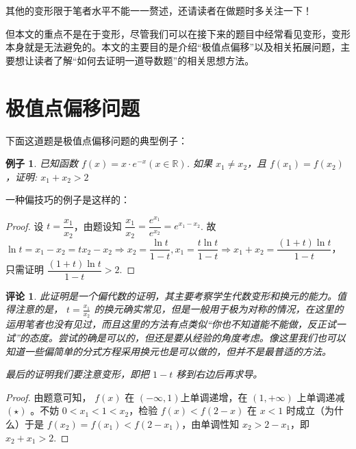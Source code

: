 \documentclass[a4paper,10pt]{article}
\newtheorem{example}{例子}
\newtheorem{remark}{评论}
\begin{document}
其他的变形限于笔者水平不能一一赘述，还请读者在做题时多关注一下！

但本文的重点不是在于变形，尽管我们可以在接下来的题目中经常看见变形，变形本身就是无法避免的。本文的主要目的是介绍“极值点偏移”以及相关拓展问题，主要想让读者了解“如何去证明一道导数题”的相关思想方法。
\section{极值点偏移问题}
下面这道题是极值点偏移问题的典型例子：

\begin{example}
    已知函数 $ f(x)=x\cdot e^{-x}(x\in\mathbb{R }) $. 如果 $ x_1\not=x_2  $，且 $ f(x_1)=f(x_2) $，证明: $ x_1+x_2>2 $   
\end{example}

一种偏技巧的例子是这样的：

\begin{proof}
    设 $ t=\dfrac{x_1 }{x_2 } $，由题设知 $ \dfrac{x_1 }{x_2 }=\dfrac{e^{x_1}}{e^{x_2}}=e^{x_1-x_2} $. 故 $ \ln t=x_1-x_2=tx_2-x_2\Rightarrow x_2=\dfrac{\ln t}{1-t},x_1=\dfrac{t\ln t }{1-t}\Rightarrow x_1+x_2=\dfrac{(1+t)\ln t  }{1-t} $，只需证明 $ \dfrac{(1+t)\ln t  }{1-t}>2 $.  
\end{proof}

\begin{remark}
    此证明是一个偏代数的证明，其主要考察学生代数变形和换元的能力。值得注意的是， $ t=\frac{x_1 }{x_2 } $ 的换元确实常见，但是一般用于极为对称的情况，在这里的运用笔者也没有见过，而且这里的方法有点类似“你也不知道能不能做，反正试一试”的态度。尝试的确是可以的，但还是要从经验的角度考虑。像这里我们也可以知道一些偏简单的分式方程采用换元也是可以做的，但并不是最普适的方法。

    最后的证明我们要注意变形，即把 $ 1-t  $ 移到右边后再求导。
\end{remark}

\begin{proof}
    由题意可知， $ f(x) $ 在 $ (-\infty,1) $上单调递增，在 $ (1,+\infty ) $ 上单调递减 $ (\star) $  。不妨 $ 0<x_1<1<x_2$，检验 $ f(x)<f(2-x) $ 在 $ x<1 $ 时成立（为什么）于是 $ f(x_2)=f(x_1)<f(2-x_1) $，由单调性知 $ x_2>2-x_1 $，即 $ x_2+x_1>2 $.   
\end{proof}
\end{document}
